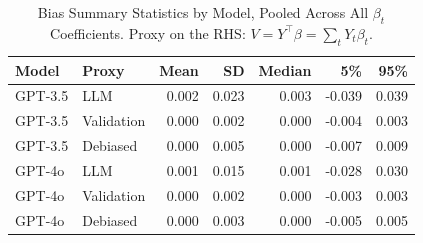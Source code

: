 \begin{table}

\caption{Bias Summary Statistics by Model, Pooled Across All $\beta_{t}$ Coefficients. Proxy on the RHS: $V = Y^\top \beta = \sum_{t} Y_t \beta_t$.}
\centering
\begin{tabular}[t]{llrrrrr}
\toprule
Model & Proxy & Mean & SD & Median & 5\% & 95\%\\
\midrule
GPT-3.5 & LLM & 0.002 & 0.023 & 0.003 & -0.039 & 0.039\\
GPT-3.5 & Validation & 0.000 & 0.002 & 0.000 & -0.004 & 0.003\\
GPT-3.5 & Debiased & 0.000 & 0.005 & 0.000 & -0.007 & 0.009\\
GPT-4o & LLM & 0.001 & 0.015 & 0.001 & -0.028 & 0.030\\
GPT-4o & Validation & 0.000 & 0.002 & 0.000 & -0.003 & 0.003\\
GPT-4o & Debiased & 0.000 & 0.003 & 0.000 & -0.005 & 0.005\\
\bottomrule
\end{tabular}
\end{table}
